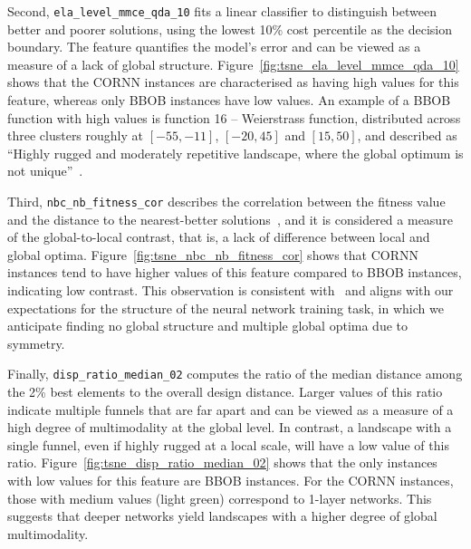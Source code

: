 \documentclass[acmsmall,screen,review,anonymous]{acmart}
\begin{document}
Second, {\tt ela\_level\_mmce\_qda\_10} fits a linear classifier to distinguish between better and poorer solutions, using the lowest 10\% cost percentile as the decision boundary. The feature quantifies the model's error and can be viewed as a measure of a lack of global structure. 
Figure~\ref{fig:tsne_ela_level_mmce_qda_10} shows that the CORNN instances are characterised as having high values for this feature, whereas only BBOB instances have low values. An example of a BBOB function with high values is function 16 -- Weierstrass function, distributed across three clusters roughly at $\left[-55,-11\right]$, $\left[-20,45\right]$ and $\left[15,50\right]$, and described as ``Highly rugged and moderately repetitive landscape, where the global optimum is not unique''~\cite{hansen:BBOB}.

Third, {\tt nbc\_nb\_fitness\_cor} describes the correlation between the fitness value and the distance to the nearest-better solutions~\cite{Kerschke2015}, and it is considered a measure of the global-to-local contrast, that is, a lack of difference between local and global optima. Figure~\ref{fig:tsne_nbc_nb_fitness_cor} shows that CORNN instances tend to have higher values of this feature compared to BBOB instances, indicating low contrast. This observation is consistent with~\cite{Malan2025} and aligns with our expectations for the structure of the neural network training task, in which we anticipate finding no global structure and multiple global optima due to symmetry. 

Finally, {\tt disp\_ratio\_median\_02} computes the ratio of the median distance among the 2\% best elements to the overall design distance. Larger values of this ratio indicate multiple funnels that are far apart and can be viewed as a measure of a high degree of multimodality at the global level. In contrast, a landscape with a single funnel, even if highly rugged at a local scale, will have a low value of this ratio. Figure~\ref{fig:tsne_disp_ratio_median_02} shows that the only instances with low values for this feature are BBOB instances. For the CORNN instances, those with medium values (light green) correspond to 1-layer networks. This suggests that deeper networks yield landscapes with a higher degree of global multimodality.

\end{document}
